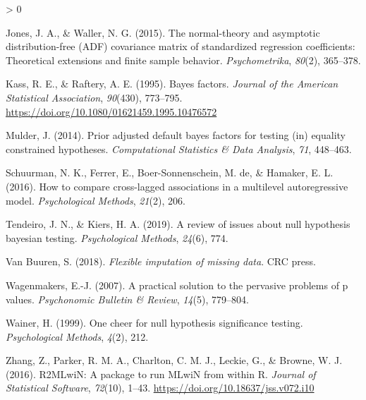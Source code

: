 \documentclass[
  english,
  man]{apa6}
\newlength{\cslhangindent}
\newenvironment{CSLReferences}[2] %
 {%
  \setlength{\parindent}{0pt}
  \ifodd #1 \everypar{\setlength{\hangindent}{\cslhangindent}}\ignorespaces\fi
  \ifnum #2 > 0
  \setlength{\parskip}{#2\baselineskip}
  \fi
 }%
 {}
\begin{document}
\begin{CSLReferences}{1}{0}
\leavevmode\hypertarget{ref-jones2015normal}{}%
Jones, J. A., \& Waller, N. G. (2015). The normal-theory and asymptotic distribution-free (ADF) covariance matrix of standardized regression coefficients: Theoretical extensions and finite sample behavior. \emph{Psychometrika}, \emph{80}(2), 365--378.

\leavevmode\hypertarget{ref-kass1995bayes}{}%
Kass, R. E., \& Raftery, A. E. (1995). Bayes factors. \emph{Journal of the American Statistical Association}, \emph{90}(430), 773--795. \url{https://doi.org/10.1080/01621459.1995.10476572}

\leavevmode\hypertarget{ref-mulder2014prior}{}%
Mulder, J. (2014). Prior adjusted default bayes factors for testing (in) equality constrained hypotheses. \emph{Computational Statistics \& Data Analysis}, \emph{71}, 448--463.

\leavevmode\hypertarget{ref-schuurman2016compare}{}%
Schuurman, N. K., Ferrer, E., Boer-Sonnenschein, M. de, \& Hamaker, E. L. (2016). How to compare cross-lagged associations in a multilevel autoregressive model. \emph{Psychological Methods}, \emph{21}(2), 206.

\leavevmode\hypertarget{ref-tendeiro2019review}{}%
Tendeiro, J. N., \& Kiers, H. A. (2019). A review of issues about null hypothesis bayesian testing. \emph{Psychological Methods}, \emph{24}(6), 774.

\leavevmode\hypertarget{ref-van2018flexible}{}%
Van Buuren, S. (2018). \emph{Flexible imputation of missing data}. CRC press.

\leavevmode\hypertarget{ref-wagenmakers2007practical}{}%
Wagenmakers, E.-J. (2007). A practical solution to the pervasive problems of p values. \emph{Psychonomic Bulletin \& Review}, \emph{14}(5), 779--804.

\leavevmode\hypertarget{ref-wainer1999one}{}%
Wainer, H. (1999). One cheer for null hypothesis significance testing. \emph{Psychological Methods}, \emph{4}(2), 212.

\leavevmode\hypertarget{ref-R2MLwiN}{}%
Zhang, Z., Parker, R. M. A., Charlton, C. M. J., Leckie, G., \& Browne, W. J. (2016). {R2MLwiN}: A package to run {MLwiN} from within {R}. \emph{Journal of Statistical Software}, \emph{72}(10), 1--43. \url{https://doi.org/10.18637/jss.v072.i10}

\end{CSLReferences}

\endgroup
\end{document}
